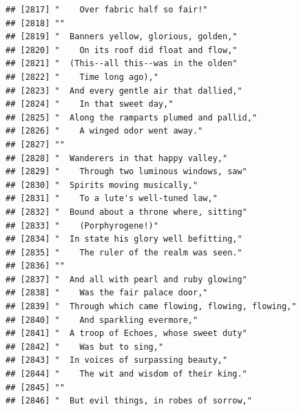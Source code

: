 \documentclass{article}\usepackage[]{graphicx}\usepackage[]{color}
\makeatletter
\newenvironment{kframe}{%
 \def\at@end@of@kframe{}%
 \ifinner\ifhmode%
  \def\at@end@of@kframe{\end{minipage}}%
  \begin{minipage}{\columnwidth}%
 \fi\fi%
 \def\FrameCommand##1{\hskip\@totalleftmargin \hskip-\fboxsep
 \colorbox{shadecolor}{##1}\hskip-\fboxsep
     \hskip-\linewidth \hskip-\@totalleftmargin \hskip\columnwidth}%
 \MakeFramed {\advance\hsize-\width
   \@totalleftmargin\z@ \linewidth\hsize
   \@setminipage}}%
 {\par\unskip\endMakeFramed%
 \at@end@of@kframe}
\newenvironment{knitrout}{}{} %
\makeatother
\begin{document}
\begin{knitrout}
\begin{kframe}
\begin{verbatim}
## [2817] "    Over fabric half so fair!"                                               
## [2818] ""                                                                            
## [2819] "  Banners yellow, glorious, golden,"                                         
## [2820] "    On its roof did float and flow,"                                         
## [2821] "  (This--all this--was in the olden"                                         
## [2822] "    Time long ago),"                                                         
## [2823] "  And every gentle air that dallied,"                                        
## [2824] "    In that sweet day,"                                                      
## [2825] "  Along the ramparts plumed and pallid,"                                     
## [2826] "    A winged odor went away."                                                
## [2827] ""                                                                            
## [2828] "  Wanderers in that happy valley,"                                           
## [2829] "    Through two luminous windows, saw"                                       
## [2830] "  Spirits moving musically,"                                                 
## [2831] "    To a lute's well-tuned law,"                                             
## [2832] "  Bound about a throne where, sitting"                                       
## [2833] "    (Porphyrogene!)"                                                         
## [2834] "  In state his glory well befitting,"                                        
## [2835] "    The ruler of the realm was seen."                                        
## [2836] ""                                                                            
## [2837] "  And all with pearl and ruby glowing"                                       
## [2838] "    Was the fair palace door,"                                               
## [2839] "  Through which came flowing, flowing, flowing,"                             
## [2840] "    And sparkling evermore,"                                                 
## [2841] "  A troop of Echoes, whose sweet duty"                                       
## [2842] "    Was but to sing,"                                                        
## [2843] "  In voices of surpassing beauty,"                                           
## [2844] "    The wit and wisdom of their king."                                       
## [2845] ""                                                                            
## [2846] "  But evil things, in robes of sorrow,"                                      

\end{verbatim}
\end{kframe}
\end{knitrout}
\end{document}
